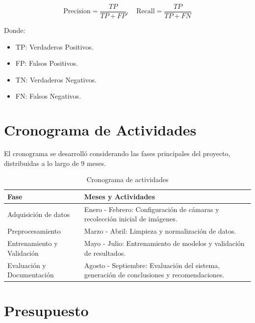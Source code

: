 \begin{equation}
\text{Precision} = \frac{TP}{TP + FP}, \quad \text{Recall} = \frac{TP}{TP + FN}
\end{equation}

Donde:
\begin{itemize}
    \item TP: Verdaderos Positivos.
    \item FP: Falsos Positivos.
    \item TN: Verdaderos Negativos.
    \item FN: Falsos Negativos.
\end{itemize}

\section{Cronograma de Actividades}

El cronograma se desarrolló considerando las fases principales del proyecto, distribuidas a lo largo de 9 meses.

\begin{table}[H]
\centering
\caption{Cronograma de actividades}
\label{table:cronograma}
\begin{tabular}{|p{4cm}|p{8cm}|}
\hline
\textbf{Fase} & \textbf{Meses y Actividades} \\ \hline
Adquisición de datos & Enero - Febrero: Configuración de cámaras y recolección inicial de imágenes. \\ \hline
Preprocesamiento & Marzo - Abril: Limpieza y normalización de datos. \\ \hline
Entrenamiento y Validación & Mayo - Julio: Entrenamiento de modelos y validación de resultados. \\ \hline
Evaluación y Documentación & Agosto - Septiembre: Evaluación del sistema, generación de conclusiones y recomendaciones. \\ \hline
\end{tabular}
\end{table}

\section{Presupuesto}

